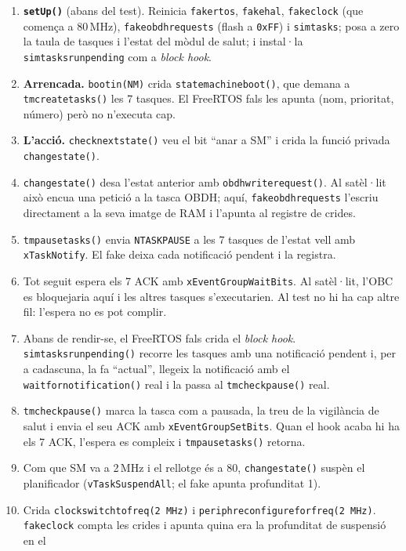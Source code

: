\documentclass[11pt,a4paper]{article}
\DeclareRobustCommand{\_}{\textunderscore\allowbreak}
\newcommand{\cd}[1]{\texttt{#1}}
\begin{document}
\begin{enumerate}[label=\textbf{\arabic*.}]
\item \textbf{\cd{setUp()}} (abans del test). Reinicia \cd{fake\_rtos}, \cd{fake\_hal},
  \cd{fake\_clock} (que comença a 80\,MHz), \cd{fake\_obdh\_requests} (flash a \cd{0xFF}) i
  \cd{sim\_tasks}; posa a zero la taula de tasques i l'estat del mòdul de salut; i instal·la
  \cd{sim\_tasks\_run\_pending} com a \emph{block hook}.
\item \textbf{Arrencada.} \cd{boot\_in(NM)} crida \cd{state\_machine\_boot()}, que demana a
  \cd{tm\_create\_tasks()} les 7 tasques. El FreeRTOS fals les apunta (nom, prioritat,
  número) però no n'executa cap.
\item \textbf{L'acció.} \cd{check\_next\_state()} veu el bit ``anar a SM'' i crida la funció
  privada \cd{change\_state()}.
\item \cd{change\_state()} desa l'estat anterior amb \cd{obdh\_write\_request()}. Al satèl·lit
  això encua una petició a la tasca OBDH; aquí, \cd{fake\_obdh\_requests} l'escriu
  directament a la seva imatge de RAM i l'apunta al registre de crides.
\item \cd{tm\_pause\_tasks()} envia \cd{N\_TASK\_PAUSE} a les 7 tasques de l'estat vell amb
  \cd{xTaskNotify}. El fake deixa cada notificació pendent i la registra.
\item Tot seguit espera els 7 ACK amb \cd{xEventGroupWaitBits}. Al satèl·lit, l'OBC es
  bloquejaria aquí i les altres tasques s'executarien. Al test no hi ha cap altre fil:
  l'espera no es pot complir.
\item Abans de rendir-se, el FreeRTOS fals crida el \emph{block hook}.
  \cd{sim\_tasks\_run\_pending()} recorre les tasques amb una notificació pendent i, per a
  cadascuna, la fa ``actual'', llegeix la notificació amb el \cd{wait\_for\_notification()}
  real i la passa al \cd{tm\_check\_pause()} real.
\item \cd{tm\_check\_pause()} marca la tasca com a pausada, la treu de la vigilància de
  salut i envia el seu ACK amb \cd{xEventGroupSetBits}. Quan el hook acaba hi ha els 7 ACK,
  l'espera es compleix i \cd{tm\_pause\_tasks()} retorna.
\item Com que SM va a 2\,MHz i el rellotge és a 80, \cd{change\_state()} suspèn el
  planificador (\cd{vTaskSuspendAll}; el fake apunta profunditat 1).
\item Crida \cd{clock\_switch\_to\_freq(2\,MHz)} i \cd{periph\_reconfigure\_for\_freq(2\,MHz)}.
  \cd{fake\_clock} compta les crides i apunta quina era la profunditat de suspensió en el

\end{enumerate}
\end{document}
